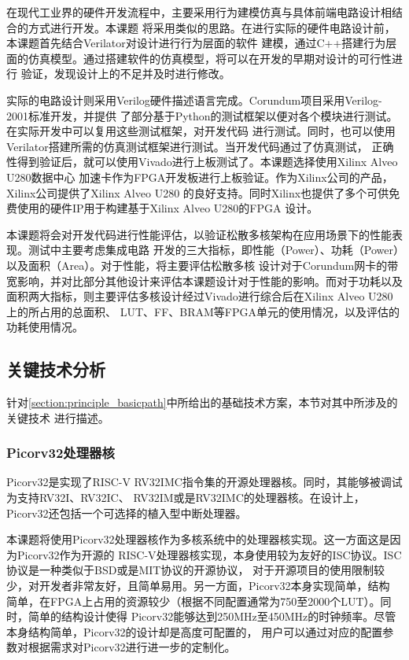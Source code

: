 在现代工业界的硬件开发流程中，主要采用行为建模仿真与具体前端电路设计相结合的方式进行开发。本课题
将采用类似的思路。在进行实际的硬件电路设计前，本课题首先结合Verilator对设计进行行为层面的软件
建模，通过C++搭建行为层面的仿真模型。通过搭建软件的仿真模型，将可以在开发的早期对设计的可行性进行
验证，发现设计上的不足并及时进行修改。

实际的电路设计则采用Verilog硬件描述语言完成。Corundum项目采用Verilog-2001标准开发，并提供
了部分基于Python的测试框架以便对各个模块进行测试。在实际开发中可以复用这些测试框架，对开发代码
进行测试。同时，也可以使用Verilator搭建所需的仿真测试框架进行测试。当开发代码通过了仿真测试，
正确性得到验证后，就可以使用Vivado进行上板测试了。本课题选择使用Xilinx Alveo U280数据中心
加速卡作为FPGA开发板进行上板验证。作为Xilinx公司的产品，Xilinx公司提供了Xilinx Alveo U280
的良好支持。同时Xilinx也提供了多个可供免费使用的硬件IP用于构建基于Xilinx Alveo U280的FPGA
设计。


本课题将会对开发代码进行性能评估，以验证松散多核架构在应用场景下的性能表现。测试中主要考虑集成电路
开发的三大指标，即性能（Power）、功耗（Power）以及面积（Area）。对于性能，将主要评估松散多核
设计对于Corundum网卡的带宽影响，并对比部分其他设计来评估本课题设计对于性能的影响。而对于功耗以及
面积两大指标，则主要评估多核设计经过Vivado进行综合后在Xilinx Alveo U280上的所占用的总面积、
LUT、FF、BRAM等FPGA单元的使用情况，以及评估的功耗使用情况。

\subsection{关键技术分析}

针对\autoref{section:principle_basicpath}中所给出的基础技术方案，本节对其中所涉及的关键技术
进行描述。

\subsubsection{Picorv32处理器核}
\label{section:principle_picorv32}

Picorv32是实现了RISC-V RV32IMC指令集的开源处理器核。同时，其能够被调试为支持RV32I、RV32IC、
RV32IM或是RV32IMC的处理器核。在设计上，Picorv32还包括一个可选择的植入型中断处理器\cite{picorv32}。

本课题将使用Picorv32处理器核作为多核系统中的处理器核实现。这一方面这是因为Picorv32作为开源的
RISC-V处理器核实现，本身使用较为友好的ISC协议。ISC协议是一种类似于BSD或是MIT协议的开源协议，
对于开源项目的使用限制较少，对开发者非常友好，且简单易用。另一方面，Picorv32本身实现简单，结构
简单，在FPGA上占用的资源较少（根据不同配置通常为750至2000个LUT）。同时，简单的结构设计使得
Picorv32能够达到250MHz至450MHz的时钟频率。尽管本身结构简单，Picorv32的设计却是高度可配置的，
用户可以通过对应的配置参数对根据需求对Picorv32进行进一步的定制化。

